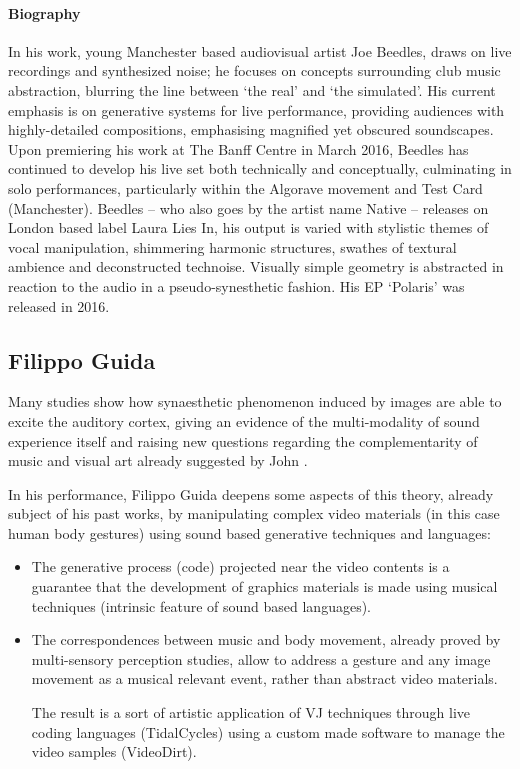 \documentclass[sigplan,10pt,review]{acmart}\settopmatter{printfolios=true}
\begin{document}
\paragraph{Biography}
In his work, young Manchester based audiovisual artist Joe Beedles,
draws on live recordings and synthesized noise; he focuses on concepts
surrounding club music abstraction, blurring the line between ‘the
real’ and ‘the simulated’. His current emphasis is on generative
systems for live performance, providing audiences with highly-detailed
compositions, emphasising magnified yet obscured soundscapes.  Upon
premiering his work at The Banff Centre in March 2016, Beedles has
continued to develop his live set both technically and conceptually,
culminating in solo performances, particularly within the Algorave
movement and Test Card (Manchester). Beedles – who also goes by the
artist name Native – releases on London based label Laura Lies In, his
output is varied with stylistic themes of vocal manipulation,
shimmering harmonic structures, swathes of textural ambience and
deconstructed technoise. Visually simple geometry is abstracted in
reaction to the audio in a pseudo-synesthetic fashion. His EP
‘Polaris’ was released in 2016.

\subsection{Filippo Guida}

Many studies show how synaesthetic phenomenon induced by images are
able to excite the auditory cortex, giving an evidence of the
multi-modality of sound experience itself \citep{Riddoch12} and raising
new questions regarding the complementarity of music and visual art
already suggested by John \citet{Whitney80}.

In his performance, Filippo Guida deepens some aspects of this theory, already
subject of his past works, by manipulating complex video materials (in
this case human body gestures) using sound based generative techniques
and languages:

\begin{itemize}
\item The generative process (code) projected near the video contents is a guarantee that the development of graphics materials is made using musical techniques (intrinsic feature of sound based languages).
\item The correspondences between music and body movement, already proved by multi-sensory perception studies, allow to address a gesture and any image movement as a musical relevant event, rather than abstract video materials\citep{Haga08}.

  The result is a sort of artistic application of VJ techniques through live coding languages (TidalCycles) using a custom made software to manage the video samples (VideoDirt).
\end{itemize}
\end{document}
